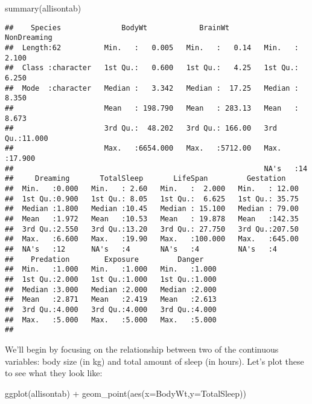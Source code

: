 \documentclass[
]{book}
\newenvironment{Shaded}{\begin{snugshade}}{\end{snugshade}}
\newcommand{\AttributeTok}[1]{\textcolor[rgb]{0.77,0.63,0.00}{#1}}
\newcommand{\FunctionTok}[1]{\textcolor[rgb]{0.00,0.00,0.00}{#1}}
\newcommand{\NormalTok}[1]{#1}
\newcommand{\SpecialCharTok}[1]{\textcolor[rgb]{0.00,0.00,0.00}{#1}}
\begin{document}
\begin{Shaded}
\begin{Highlighting}[]
\FunctionTok{summary}\NormalTok{(allisontab)}
\end{Highlighting}
\end{Shaded}

\begin{verbatim}
##    Species              BodyWt            BrainWt         NonDreaming    
##  Length:62          Min.   :   0.005   Min.   :   0.14   Min.   : 2.100  
##  Class :character   1st Qu.:   0.600   1st Qu.:   4.25   1st Qu.: 6.250  
##  Mode  :character   Median :   3.342   Median :  17.25   Median : 8.350  
##                     Mean   : 198.790   Mean   : 283.13   Mean   : 8.673  
##                     3rd Qu.:  48.202   3rd Qu.: 166.00   3rd Qu.:11.000  
##                     Max.   :6654.000   Max.   :5712.00   Max.   :17.900  
##                                                          NA's   :14      
##     Dreaming       TotalSleep       LifeSpan         Gestation     
##  Min.   :0.000   Min.   : 2.60   Min.   :  2.000   Min.   : 12.00  
##  1st Qu.:0.900   1st Qu.: 8.05   1st Qu.:  6.625   1st Qu.: 35.75  
##  Median :1.800   Median :10.45   Median : 15.100   Median : 79.00  
##  Mean   :1.972   Mean   :10.53   Mean   : 19.878   Mean   :142.35  
##  3rd Qu.:2.550   3rd Qu.:13.20   3rd Qu.: 27.750   3rd Qu.:207.50  
##  Max.   :6.600   Max.   :19.90   Max.   :100.000   Max.   :645.00  
##  NA's   :12      NA's   :4       NA's   :4         NA's   :4       
##    Predation        Exposure         Danger     
##  Min.   :1.000   Min.   :1.000   Min.   :1.000  
##  1st Qu.:2.000   1st Qu.:1.000   1st Qu.:1.000  
##  Median :3.000   Median :2.000   Median :2.000  
##  Mean   :2.871   Mean   :2.419   Mean   :2.613  
##  3rd Qu.:4.000   3rd Qu.:4.000   3rd Qu.:4.000  
##  Max.   :5.000   Max.   :5.000   Max.   :5.000  
## 
\end{verbatim}

We'll begin by focusing on the relationship between two of the continuous variables: body size (in kg) and total amount of sleep (in hours). Let's plot these to see what they look like:

\begin{Shaded}
\begin{Highlighting}[]
\FunctionTok{ggplot}\NormalTok{(allisontab) }\SpecialCharTok{+} \FunctionTok{geom\_point}\NormalTok{(}\FunctionTok{aes}\NormalTok{(}\AttributeTok{x=}\NormalTok{BodyWt,}\AttributeTok{y=}\NormalTok{TotalSleep))}
\end{Highlighting}
\end{Shaded}
\end{document}
